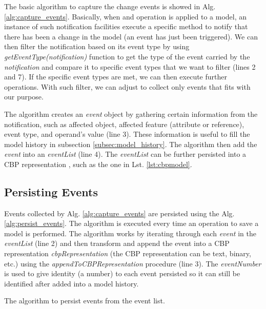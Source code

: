 \documentclass{llncs}
\begin{document}
The basic algorithm to capture the change events is showed in Alg. \ref{alg:capture_events}. Basically, when and operation is applied to a model, an instance of such notification facilities execute a specific method to notify that there has been a change in the model (an event has just been triggered). We can then filter the notification based on its event type by using \emph{getEventType(notification)} function to get the type of the event carried by the \emph{notification} and compare it to specific event types that we want to filter (lines 2 and 7). If the specific event types are met, we can then execute further operations. With such filter, we can adjust to collect only events that fits with our purpose.

The algorithm creates an \emph{event} object by gathering certain information from the notification, such as affected object, affected feature (attribute or reference), event type, and operand's value (line 3). These information is useful to fill the model history in subsection \ref{subsec:model_history}. The algorithm then add the \emph{event} into an \emph{eventList} (line 4). The \emph{eventList} can be further persisted into a CBP representation \cite{yohannis2017turning}, such as the one in Lst. \ref{lst:cbpmodel}. 

\subsection{Persisting Events}
\label{subsec:persisting_events}
Events collected by Alg. \ref{alg:capture_events} are persisted using the Alg. \ref{alg:persist_events}. The algorithm is executed every time an operation to save a model is performed. The algorithm works by iterating through each \emph{event} in the \emph{eventList} (line 2) and then transform and append the event into a CBP representation \emph{cbpRepresentation} (the CBP representation can be text, binary, etc.) using the \emph{appendToCBPRepresentation} procedure (line 3). The \emph{eventNumber} is used to give identity (a number) to each event persisted so it can still be identified after added into a model history.

\begin{algorithm}
\begin{small}
\end{small}
\caption{The algorithm to persist events from the event list.}
\label{alg:persist_events}
\end{algorithm}
\end{document}
